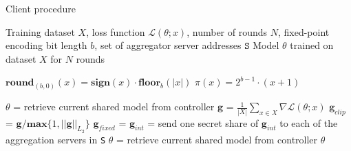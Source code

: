 \documentclass{article}
\begin{document}
\begin{algorithm}[h]
  \caption{Client procedure}\label{alg:client}

  \begin{algorithmic}[1]
  \Require Training dataset $X$, loss function $\mathcal L(\theta; x)$, number of rounds $N$, fixed-point encoding bit length $b$, set of aggregator server addresses $\texttt{S}$
  \Ensure Model $\theta$ trained on dataset $X$ for $N$ rounds

  \State $\textbf{round}_{(b,0)}(x) = \textbf{sign}(x) \cdot \textbf{floor}_b(|x|)$ 
  \State $\pi(x) = 2^{b-1}\cdot (x + 1)$ 

  \label{lst:line:loop}
  \State$\theta$ = retrieve current shared model from controller\label{lst:line:retrieve}
  \State$\textbf{g}$ = $\frac{1}{|X|} \sum_{x\in X} \nabla\mathcal L(\theta; x)$ 
\label{lst:line:grad}
  \State$\textbf{g}_{clip}$ = $\textbf{g}/\mathbf{max}\{1,||\textbf{g}||_{L_2}\}$ \label{lst:line:clip}
  \State$\textbf{g}_{fixed}$ =  
  \State$\textbf{g}_{int}$ =  
\label{lst:line:project}
  \State send one secret share of $\textbf{g}_{int}$ to each of the aggregation servers in \texttt S
  \EndFor
  \State$\theta$ = retrieve current shared model from controller
  \State\Return $\theta$
  \end{algorithmic}
\end{algorithm}
\end{document}
